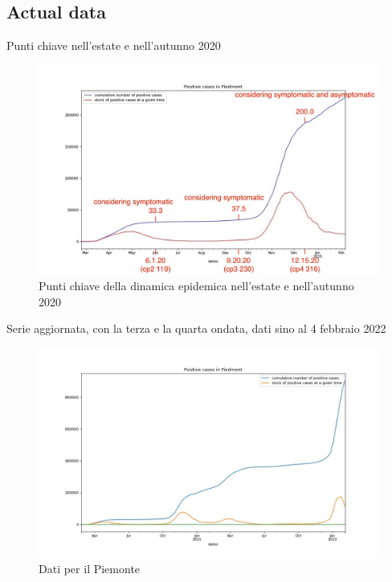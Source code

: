 \documentclass[]{beamer}
\begin{document}
\subsection{Actual data}

\begin{frame}{Punti chiave nell'estate e nell'autunno 2020}

\begin{figure}[H]
\center
\includegraphics[scale=0.25]{andamento900annotato.jpg}
\caption{Punti chiave della dinamica epidemica nell'estate e nell'autunno 2020}
\label{Key points}
\end{figure}


\end{frame}


\begin{frame}{Serie aggiornata, con la terza e la quarta ondata, dati sino al 4 febbraio 2022}

\begin{figure}[H]
\center
\includegraphics[scale=0.35]{andamento900.jpg}
\caption{Dati per il Piemonte}
\label{dataP}
\end{figure}


\end{frame}
\end{document}
